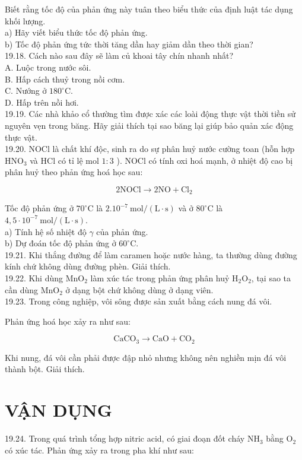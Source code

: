 \documentclass[10pt]{article}
\begin{document}
Biết rằng tốc độ của phản ứng này tuân theo biểu thức của định luật tác dụng khối lượng.\\
a) Hãy viết biểu thức tốc độ phản ứng.\\
b) Tốc độ phản ứng tức thời tăng dần hay giảm dần theo thời gian?\\
19.18. Cách nào sau đây sẽ làm củ khoai tây chín nhanh nhất?\\
A. Luộc trong nước sôi.\\
B. Hấp cách thuỷ trong nồi cơm.\\
C. Nướng ở $180^{\circ} \mathrm{C}$.\\
D. Hấp trên nồi hơi.\\
19.19. Các nhà khảo cổ thường tìm được xác các loài động thực vật thời tiền sử nguyên vẹn trong băng. Hãy giải thích tại sao băng lại giúp bảo quản xác động thực vật.\\
19.20. NOCl là chất khí độc, sinh ra do sự phân huỷ nước cường toan (hỗn hợp $\mathrm{HNO}_{3}$ và HCl có tỉ lệ mol $1: 3$ ). NOCl có tính oxi hoá mạnh, ở nhiệt độ cao bị phân huỷ theo phản ứng hoá học sau:

$$
2 \mathrm{NOCl} \rightarrow 2 \mathrm{NO}+\mathrm{Cl}_{2}
$$

Tốc độ phản ứng ở $70^{\circ} \mathrm{C}$ là $2.10^{-7} \mathrm{~mol} /(\mathrm{L} \cdot \mathrm{s})$ và ở $80^{\circ} \mathrm{C}$ là $4,5 \cdot 10^{-7} \mathrm{~mol} /(\mathrm{L} \cdot \mathrm{s})$.\\
a) Tính hệ số nhiệt độ $\gamma$ của phản ứng.\\
b) Dự đoán tốc độ phản ứng ở $60^{\circ} \mathrm{C}$.\\
19.21. Khi thắng đường để làm caramen hoặc nước hàng, ta thường dùng đường kính chứ không dùng đường phèn. Giải thích.\\
19.22. Khi dùng $\mathrm{MnO}_{2}$ làm xúc tác trong phản ứng phân huỷ $\mathrm{H}_{2} \mathrm{O}_{2}$, tại sao ta cần dùng $\mathrm{MnO}_{2}$ ở dạng bột chứ không dùng ở dạng viên.\\
19.23. Trong công nghiệp, vôi sông được sản xuất bằng cách nung đá vôi.

Phản ứng hoá học xảy ra như sau:

$$
\mathrm{CaCO}_{3} \rightarrow \mathrm{CaO}+\mathrm{CO}_{2}
$$

Khi nung, đá vôi cần phải được đập nhỏ nhưng không nên nghiền mịn đá vôi thành bột. Giải thích.

\section*{VẬN DỤNG}
19.24. Trong quá trình tổng hợp nitric acid, có giai đoạn đốt cháy $\mathrm{NH}_{3}$ bằng $\mathrm{O}_{2}$ có xúc tác. Phản ứng xảy ra trong pha khí như sau:
\end{document}
